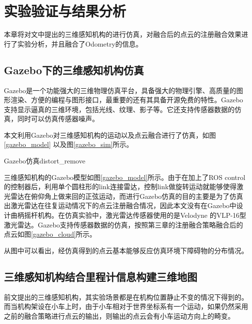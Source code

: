 
\chapter{实验验证与结果分析}
本章将对文中提出的三维感知机构的进行仿真，对融合后的点云的注册融合效果进行了实验分析，并且融合了Odometry的信息。

\section{Gazebo下的三维感知机构仿真}

Gazebo是一个功能强大的三维物理仿真平台，具备强大的物理引擎、高质量的图形渲染、方便的编程与图形接口，最重要的还有其具备开源免费的特性。Gazebo支持显示逼真的三维环境，包括光线、纹理、影子等。它还支持传感器数据的仿真，同时可以仿真传感器噪声。

本文利用Gazebo对三维感知机构的运动以及点云融合进行了仿真，如图\ref{gazebo_model} 以及图\ref{gazebo_sim}所示。

\begin{pics}[htbp]{Gazebo仿真}{distort_remove}
\end{pics}

三维感知机构的Gazebo模型如图\ref{gazebo_model}所示。由于在加上了ROS control的控制器后，利用单个圆柱形的link连接雷达，控制link做旋转运动就能够使得激光雷达在俯仰角上做来回的正弦运动，而进行Gazebo仿真的目的主要是为了仿真出激光雷达在往复运动情况下的点云注册融合情况，因此本文没有在Gazebo中设计曲柄摇杆机构。在仿真实验中，激光雷达传感器使用的是Velodyne 的VLP-16型激光雷达。Gazebo支持传感器数据的仿真，按照第三章的注册融合策略融合后的点云如图\ref{gazebo_cloud}所示。


从图中可以看出，经仿真得到的点云基本能够反应仿真环境下障碍物的分布情况。

\section{三维感知机构结合里程计信息构建三维地图}

前文提出的三维感知机构，其实验场景都是在机构位置静止不变的情况下得到的。而当机构架设在小车上时，由于小车相对于世界坐标系有一个运动，如果仍然采用之前的融合策略进行点云的输出，则输出的点云会有小车运动方向上的畸变。

